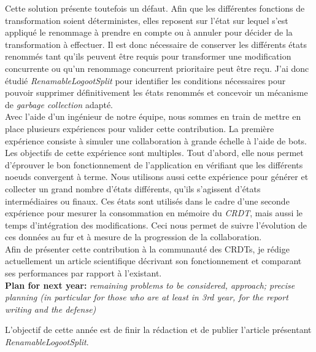 \documentclass[12pt]{article}
\newcommand{\commentaire}[1]{\small\textit{#1}}
\begin{document}

Cette solution présente toutefois un défaut.
Afin que les différentes fonctions de transformation soient déterministes, elles reposent sur l'état sur lequel s'est appliqué le renommage à prendre en compte ou à annuler pour décider de la transformation à effectuer.
Il est donc nécessaire de conserver les différents états renommés tant qu'ils peuvent être requis pour transformer une modification concurrente ou qu'un renommage concurrent prioritaire peut être reçu.
J'ai donc étudié \emph{RenamableLogootSplit} pour identifier les conditions nécessaires pour pouvoir supprimer définitivement les états renommés et concevoir un mécanisme de \emph{garbage collection} adapté.
\\

Avec l'aide d'un ingénieur de notre équipe, nous sommes en train de mettre en place plusieurs expériences pour valider cette contribution.
La première expérience consiste à simuler une collaboration à grande échelle à l'aide de bots.
Les objectifs de cette expérience sont multiples.
Tout d'abord, elle nous permet d'éprouver le bon fonctionnement de l'application en vérifiant que les différents noeuds convergent à terme.
Nous utilisons aussi cette expérience pour générer et collecter un grand nombre d'états différents, qu'ils s'agissent d'états intermédiaires ou finaux.
Ces états sont utilisés dans le cadre d'une seconde expérience pour mesurer la consommation en mémoire du \emph{CRDT}, mais aussi le temps d'intégration des modifications.
Ceci nous permet de suivre l'évolution de ces données au fur et à mesure de la progression de la collaboration.
\\

Afin de présenter cette contribution à la communauté des \acp{CRDT}, je rédige actuellement un article scientifique décrivant son fonctionnement et comparant ses performances par rapport à l'existant.\\

\noindent\textbf{Plan for next year:}
\commentaire{%
  remaining problems to be considered, approach; precise planning (in
  particular for those who are at least in 3rd year, for the report
  writing and the defense)\\}

L'objectif de cette année est de finir la rédaction et de publier l'article présentant \emph{RenamableLogootSplit}.
\\
\end{document}
